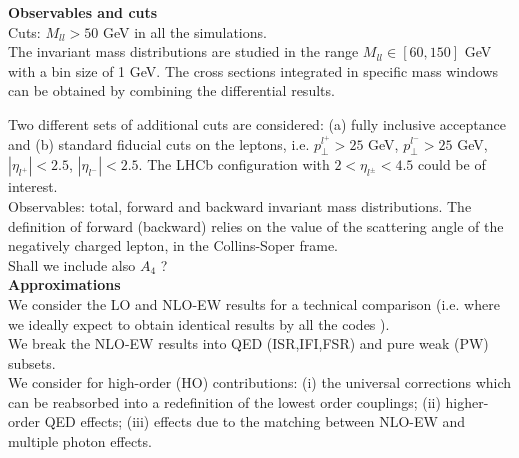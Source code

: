 {\bf Observables and cuts}\\
Cuts: $M_{ll}> 50$ GeV in all the simulations.\\
The invariant mass distributions are studied in the range
$M_{ll}\in [60,150]$ GeV with a bin size of 1 GeV.
The cross sections integrated in specific mass windows can be obtained by combining the differential results.

Two different sets of additional cuts are considered:
(a) fully inclusive acceptance and
(b) standard fiducial cuts on the leptons, i.e.
$p_\perp^{l^+}>25$ GeV,
$p_\perp^{l^-}>25$ GeV,
$|\eta_{l^+}|<2.5$,
$|\eta_{l^-}|<2.5$.
The LHCb configuration with $2<\eta_{l^\pm}<4.5$ could be of interest.\\[5mm]
Observables: total, forward and backward invariant mass distributions.
The definition of forward (backward) relies on the value of the scattering angle
of the negatively charged lepton, in the Collins-Soper frame.\\
Shall we include also $A_4$ ?\\[5mm]

{\bf Approximations}\\
We consider the LO and NLO-EW results for a technical comparison
(i.e. where we ideally expect to obtain identical results by all the codes ).\\
We break the NLO-EW results into QED (ISR,IFI,FSR) and pure weak (PW) subsets.\\
We consider for high-order (HO) contributions:
(i) the universal corrections which can be reabsorbed into a redefinition
of the lowest order couplings;
(ii) higher-order QED effects;
(iii) effects due to the matching between NLO-EW and multiple photon effects.









